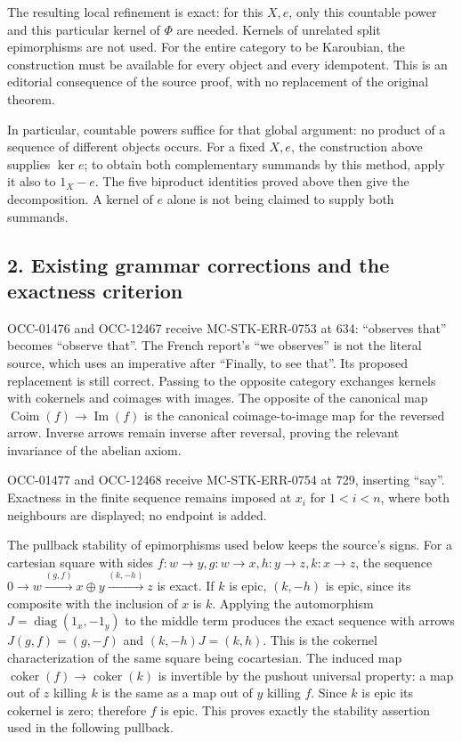\documentclass[11pt]{article}
\begin{document}
The resulting local refinement is exact: for this \(X,e\), only this countable power and this particular kernel of \(\Phi\) are needed. Kernels of unrelated split epimorphisms are not used. For the entire category to be Karoubian, the construction must be available for every object and every idempotent. This is an editorial consequence of the source proof, with no replacement of the original theorem.

In particular, countable powers suffice for that global argument: no product of a sequence of different objects occurs. For a fixed \(X,e\), the construction above supplies \(\ker e\); to obtain both complementary summands by this method, apply it also to \(1_X-e\). The five biproduct identities proved above then give the decomposition. A kernel of \(e\) alone is not being claimed to supply both summands.

\subsection{2. Existing grammar corrections and the exactness criterion}\label{note-01-existing-grammar-corrections-and-the-exactness-criterion}

OCC-01476 and OCC-12467 receive MC-STK-ERR-0753 at 634: ``observes that'' becomes ``observe that''. The French report's ``we observes'' is not the literal source, which uses an imperative after ``Finally, to see that''. Its proposed replacement is still correct. Passing to the opposite category exchanges kernels with cokernels and coimages with images. The opposite of the canonical map \(\operatorname{Coim}(f)\to\operatorname{Im}(f)\) is the canonical coimage-to-image map for the reversed arrow. Inverse arrows remain inverse after reversal, proving the relevant invariance of the abelian axiom.

OCC-01477 and OCC-12468 receive MC-STK-ERR-0754 at 729, inserting ``say''. Exactness in the finite sequence remains imposed at \(x_i\) for \(1<i<n\), where both neighbours are displayed; no endpoint is added.

The pullback stability of epimorphisms used below keeps the source's signs. For a cartesian square with sides \(f:w\to y,g:w\to x,h:y\to z,k:x\to z\), the sequence \(0\to w\xrightarrow{(g,f)}x\oplus y\xrightarrow{(k,-h)}z\) is exact. If \(k\) is epic, \((k,-h)\) is epic, since its composite with the inclusion of \(x\) is \(k\). Applying the automorphism \(J=\operatorname{diag}(1_x,-1_y)\) to the middle term produces the exact sequence with arrows \(J(g,f)=(g,-f)\) and \((k,-h)J=(k,h)\). This is the cokernel characterization of the same square being cocartesian. The induced map \(\operatorname{coker}(f)\to\operatorname{coker}(k)\) is invertible by the pushout universal property: a map out of \(z\) killing \(k\) is the same as a map out of \(y\) killing \(f\). Since \(k\) is epic its cokernel is zero; therefore \(f\) is epic. This proves exactly the stability assertion used in the following pullback.
\end{document}
